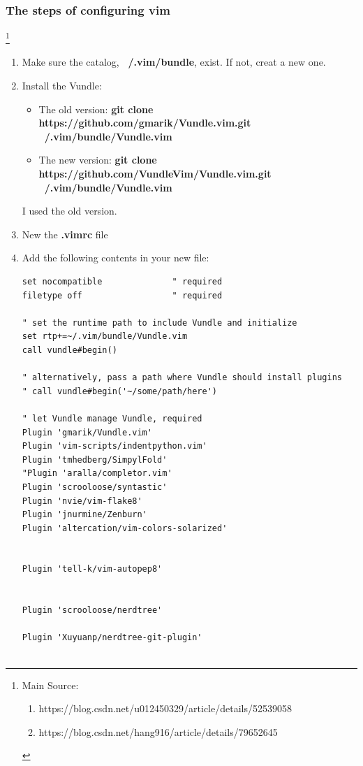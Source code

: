 \documentclass{article}
\begin{document}
\subsubsection{The steps of configuring vim} \footnote{Main Source:
\begin{enumerate}
\item https://blog.csdn.net/u012450329/article/details/52539058
\item https://blog.csdn.net/hang916/article/details/79652645
\end{enumerate}
}
\begin{enumerate}


\item Make sure the catalog, \textbf{~/.vim/bundle}, exist. If not, creat a new one.

\item Install the Vundle:

\begin{itemize}
\item \textnormal{The old version:} \bf {git clone https://github.com/gmarik/Vundle.vim.git ~/.vim/bundle/Vundle.vim}
\item \textnormal{The new version:} \bf {git clone https://github.com/VundleVim/Vundle.vim.git ~/.vim/bundle/Vundle.vim}
\end{itemize}
I used the old version.


\item New the \textbf{.vimrc} file


\item Add the following contents in your new file:
\begin{lstlisting}
set nocompatible              " required
filetype off                  " required

" set the runtime path to include Vundle and initialize
set rtp+=~/.vim/bundle/Vundle.vim
call vundle#begin()

" alternatively, pass a path where Vundle should install plugins
" call vundle#begin('~/some/path/here')

" let Vundle manage Vundle, required
Plugin 'gmarik/Vundle.vim'
Plugin 'vim-scripts/indentpython.vim'
Plugin 'tmhedberg/SimpylFold'
"Plugin 'aralla/completor.vim'
Plugin 'scrooloose/syntastic'
Plugin 'nvie/vim-flake8'
Plugin 'jnurmine/Zenburn'
Plugin 'altercation/vim-colors-solarized'


Plugin 'tell-k/vim-autopep8'


Plugin 'scrooloose/nerdtree'

Plugin 'Xuyuanp/nerdtree-git-plugin'


\end{lstlisting}
\end{enumerate}
\end{document}
